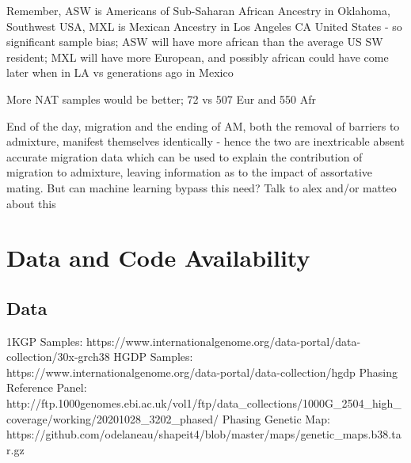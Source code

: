 \documentclass[11pt]{article}
\begin{document}
Remember, ASW is Americans of Sub-Saharan African Ancestry in Oklahoma, Southwest USA, MXL is Mexican Ancestry in Los Angeles CA United States - so significant sample bias; ASW will have more african than the average US SW resident; MXL will have more European, and possibly african could have come later when in LA vs generations ago in Mexico


More NAT samples would be better; 72 vs 507 Eur and 550 Afr





End of the day, migration and the ending of AM, both the removal of barriers to admixture, manifest themselves identically - hence the two are inextricable absent accurate migration data which can be used to explain the contribution of migration to admixture, leaving information as to the impact of assortative mating.
But can machine learning bypass this need? Talk to alex and/or matteo about this















\section{Data and Code Availability}

\subsection{Data}

1KGP Samples: https://www.internationalgenome.org/data-portal/data-collection/30x-grch38
HGDP Samples: https://www.internationalgenome.org/data-portal/data-collection/hgdp
Phasing Reference Panel: http://ftp.1000genomes.ebi.ac.uk/vol1/ftp/data\_collections/1000G\_2504\_high\_coverage/working/20201028\_3202\_phased/
Phasing Genetic Map: https://github.com/odelaneau/shapeit4/blob/master/maps/genetic\_maps.b38.tar.gz
\end{document}
